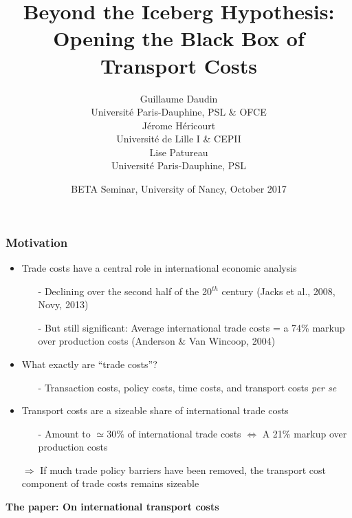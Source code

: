 \documentclass[10 pt,Helvetica, french]{beamer}
\date[October 2017]{BETA Seminar, University of Nancy, October 2017}
\title[Trade Costs Black Box]{Beyond the Iceberg Hypothesis: \\Opening the Black Box of Transport Costs}
\author[Daudin et al.]{Guillaume Daudin\\
{\footnotesize Universit\'{e} Paris-Dauphine, PSL \& OFCE }\\ \smallskip
J\'{e}rome H\'{e}ricourt \\
{\footnotesize Universit\'{e} de Lille I \& CEPII }\\  \smallskip
Lise Patureau \\
{\footnotesize  Universit\'{e} Paris-Dauphine, PSL}}
\begin{document}
\begin{frame}[plain]
\titlepage
\end{frame}


\begin{frame}
\frametitle{Motivation}
\begin{itemize}
\item Trade costs have a central role in international economic analysis \vspace{0.1cm}
\begin{itemize}
\item[-] Declining over the second half of the 20$^{th}$ century (Jacks et al., 2008, Novy, 2013) \vspace{0.1cm}
\item[-] But still significant: Average international trade costs = a 74\% markup over production costs (Anderson \& Van Wincoop, 2004)
\end{itemize}
\item What exactly are ``trade costs''?  \vspace{0.1cm}
\begin{itemize}
\item[-] Transaction costs, policy costs, time costs, and transport costs \textit{per se}
\end{itemize}
\item Transport costs are a sizeable share of international trade costs \vspace{0.1cm}
\begin{itemize}
\item[-]  Amount to $\simeq 30\%$ of international trade costs  $\Leftrightarrow$ A 21\% markup over production costs  \vspace{0.1cm}
\end{itemize}
\item[$\Rightarrow$] If much trade policy barriers have been removed, the transport cost component of trade costs remains sizeable \vspace{0.1cm}
\end{itemize}
\textbf{The paper: On international transport costs}

\end{frame}
\end{document}
